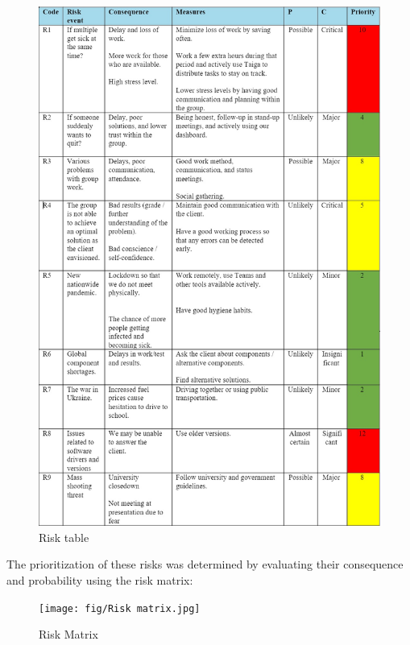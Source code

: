 \begin{figure}
\centering
\includegraphics[width=0.85\linewidth]{fig/RisikoTabell.jpg}
\caption{Risk table}
\label{fig:yourlabel}
\end{figure}

\newpage

The prioritization of these risks was determined by evaluating their consequence and probability using the risk matrix:

\begin{figure}[h!]
\centering
\texttt{[image: fig/Risk matrix.jpg]}
\caption{Risk Matrix \cite{RiskMatrix}} 
\label{fig:yourlabel}
\end{figure}


